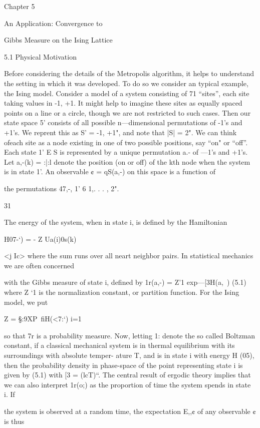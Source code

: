 
Chapter 5

An Application: Convergence to

Gibbs Measure on the Ising Lattice

5.1 Physical Motivation

Before considering the details of the Metropolis algorithm, it helps to understand the
setting in which it was developed. To do so we consider an typical example, the Ising model.
Consider a model of a system consisting of 71 “sites”, each site taking values in {-1, +1}. It might
help to imagine these sites as equally spaced points on a line or a circle, though we are not restricted
to such cases. Then our state space 5' consists of all possible n—dimensional permutations of -1’s
and +1’s. We reprent this as S’ = {-1, +1}", and note that |S| = 2". We can think ofeach site as
a node existing in one of two possible positions, say “on" or “off”. Each state 1' E S is represented
by a unique permutation a.- of —1’s and +1’s. Let a,-(k) = :|:l denote the position (on or off) of
the kth node when the system is in state 1'. An observable ¢ = qS(a,-) on this space is a function of

the permutations 47,-, 1' 6 {1,. . . , 2"}.

31

The energy of the system, when in state i, is deﬁned by the Hamiltonian

H07-‘) = - Z Ua(i)0s(k)

<j Ic>
where the sum runs over all neart neighbor pairs. In statistical mechanics we are often concerned

with the Gibbs measure of state i, deﬁned by
1r(a,-) = Z'1 exp{—[3H(a,~)} (5.1)
where Z ‘1 is the normalization constant, or partition function. For the Ising model, we put

Z = §:9XP{~ﬁH(<7:‘)}
i=1

so that 7r is a probability measure. Now, letting 1: denote the so called Boltzman constant, if a
classical mechanical system is in thermal equilibrium with its surroundings with absolute temper-
ature T, and is in state i with energy H (05), then the probability density in phase-space of the
point representing state i is given by (5.1) with [3 = (lcT)“. The central result of ergodic theory
implies that we can also interpret 1r(o;) as the proportion of time the system spends in state i. If

the system is observed at a random time, the expectation E,,¢ of any observable ¢ is thus

